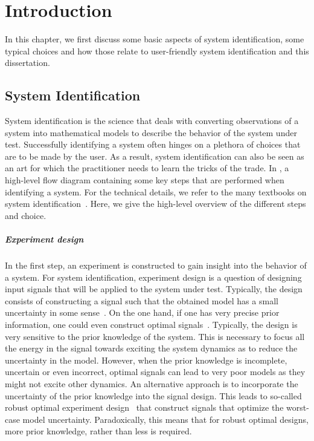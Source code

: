 \chapter{Introduction}
\def\thisDir{ch01-intro}

In this chapter, we first discuss some basic aspects of system identification, some typical choices and how those relate to user-friendly system identification and this dissertation.

\section{System Identification}

System identification is the science that deals with converting observations of a system into mathematical models to describe the behavior of the system under test.
Successfully identifying a system often hinges on a plethora of choices that are to be made by the user.
As a result, system identification can also be seen as an art for which the practitioner needs to learn the tricks of the trade.
In , a high-level flow diagram containing some key steps that are performed when identifying a system.
For the technical details, we refer to the many textbooks on system identification~\citep{Soderstrom1989,Ljung1999,Pintelon2012}.
Here, we give the high-level overview of the different steps and choice.

\paragraph{Experiment design}
In the first step, an experiment is constructed to gain insight into the behavior of a system.
For system identification, experiment design is a question of designing input signals that will be applied to the system under test.
Typically, the design consists of constructing a signal such that the obtained model  has a small uncertainty in some sense~\citep{Goodwin1977,Goodwin2006GBO}.
On the one hand, if one has very precise prior information, one could even construct optimal signals~\citep{Gevers2011ExpDesign}.
Typically, the design is very sensitive to the prior knowledge of the system.
This is necessary to focus all the energy in the signal towards exciting the system dynamics as to reduce the uncertainty in the model.
However, when the prior knowledge is incomplete, uncertain or even incorrect, optimal signals can lead to very poor models as they might not excite other dynamics.
An alternative approach is to incorporate the uncertainty of the prior knowledge into the signal design.
This leads to so-called robust optimal experiment design~\citep{Rojas2012,Goodwin2006} that construct signals that optimize the worst-case model uncertainty.
Paradoxically, this means that for robust optimal designs, more prior knowledge, rather than less is required.

